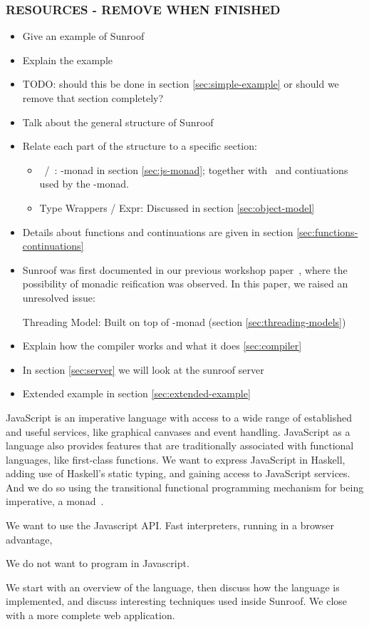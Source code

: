 \subsubsection{RESOURCES - REMOVE WHEN FINISHED}

\begin{itemize}
\item Give an example of Sunroof 
\item Explain the example
\item TODO: should this be done in section \ref{sec:simple-example} or should we remove that section completely?
\item Talk about the general structure of Sunroof
\item Relate each part of the structure to a specific section:
  \begin{itemize}
  \item \JSA\ /\ \JSB: \JS-monad in section \ref{sec:js-monad};
  together with \JSI\ and contiuations used by the \JS-monad.
  \item Type Wrappers / Expr: Discussed in section \ref{sec:object-model}
  \end{itemize}
\item Details about functions and continuations are given in section \ref{sec:functions-continuations}
\item 
Sunroof was first documented in our previous 
workshop paper~\cite{Farmer:12:WebDSLs},
where the possibility of monadic reification was observed.
In this paper, we raised an unresolved issue:

Threading Model: Built on top of \JS-monad (section \ref{sec:threading-models})
\item Explain how the compiler works and what it does \ref{sec:compiler}
\item In section \ref{sec:server} we will look at the sunroof server 
\item Extended example in section \ref{sec:extended-example}
\end{itemize}

JavaScript is an imperative language with access to a wide range
of established and useful services, like graphical canvases and event
handling. JavaScript as a language also provides features that are
traditionally associated with functional languages, like first-class 
functions. We want to express JavaScript in Haskell, adding use
of Haskell's static typing, and gaining access to JavaScript services.
And we do so using the transitional functional programming 
mechanism for being imperative, a monad~\cite{Moggi:91:ComputationMonads}.


We want to use the Javascript API. Fast interpreters,
running in a browser advantage, 

We do not want to program in Javascript.

We start with an overview of the language, then discuss
how the language is implemented, and discuss interesting
techniques used inside Sunroof. We close with a more
complete web application.




